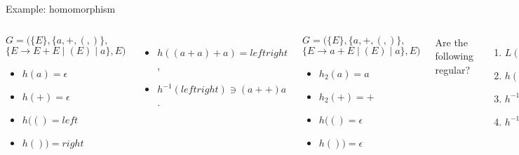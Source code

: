 \documentclass[handout]{beamer}
\begin{document}
  
\begin{frame}{Example: homomorphism}
        
    \begin{columns}

    
        \begin{example}
            $G=(\{E\},\{a,+,(,)\},$ $\{E\rightarrow E+E\mid (E)\mid a\},E)$        
            \begin{itemize}            
                \item $h(a)=\epsilon$
                \item $h(+)=\epsilon$
                \item $h(()=left$
                \item $h())=right$               
            \end{itemize}
        \end{example}
        \begin{itemize}
            \item $h((a+a)+a)=leftright $,
            \item $h^{-1}(leftright)\ni (a++)a$.
        \end{itemize}

        \vspace{1.75cm}
    

        \begin{example}
            $G=(\{E\},\{a,+,(,)\},$ $\{E\rightarrow a+E\mid (E)\mid a\},E)$
            \begin{itemize}
                \item $h_2(a)=a$
                \item $h_2(+)=+$
                \item $h(()=\epsilon$
                \item $h())=\epsilon$
            \end{itemize}
        \end{example}
        Are the following regular?
        \begin{enumerate}
            \item $L(G)$
            \item $h(L(G))$
            \item $h^{-1}(h(L(G)))$
            \item $h^{-1}(h(L(G)))=L(G)$
        \end{enumerate}        
        
    \end{columns}
            
\end{frame}
\end{document}
